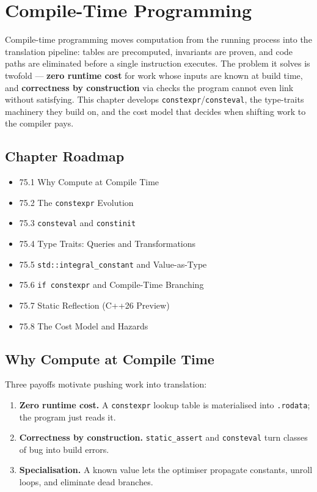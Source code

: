 \chapter{Compile-Time Programming}

Compile-time programming moves computation from the running process into the translation pipeline: tables are precomputed, invariants are proven, and code paths are eliminated before a single instruction executes. The problem it solves is twofold --- \textbf{zero runtime cost} for work whose inputs are known at build time, and \textbf{correctness by construction} via checks the program cannot even link without satisfying. This chapter develops \texttt{constexpr}/\texttt{consteval}, the type-traits machinery they build on, and the cost model that decides when shifting work to the compiler pays.

\section*{Chapter Roadmap}
\begin{itemize}
\item 75.1 Why Compute at Compile Time
\item 75.2 The \texttt{constexpr} Evolution
\item 75.3 \texttt{consteval} and \texttt{constinit}
\item 75.4 Type Traits: Queries and Transformations
\item 75.5 \texttt{std::integral\_constant} and Value-as-Type
\item 75.6 \texttt{if constexpr} and Compile-Time Branching
\item 75.7 Static Reflection (C++26 Preview)
\item 75.8 The Cost Model and Hazards
\end{itemize}

\section{Why Compute at Compile Time}
Three payoffs motivate pushing work into translation:
\begin{enumerate}
\item \textbf{Zero runtime cost.} A \texttt{constexpr} lookup table is materialised into \texttt{.rodata}; the program just reads it.
\item \textbf{Correctness by construction.} \texttt{static\_assert} and \texttt{consteval} turn classes of bug into build errors.
\item \textbf{Specialisation.} A known value lets the optimiser propagate constants, unroll loops, and eliminate dead branches.
\end{enumerate}

